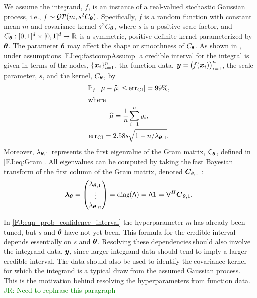 \documentclass[graybox,footinfo]{svmult}
\newcommand{\JRNote}[1]{{\textcolor{green}{JR: #1}}}
\begin{document}
We assume the integrand, $f$, is an instance of a real-valued stochastic Gaussian process, i.e., $f \sim \mathcal{GP}(m,s^2 C_{\boldsymbol{\theta}})$.  Specifically, $f$ is a random function with constant mean $m$ and covariance kernel $s^2C_{\boldsymbol{\theta}}$, where $s$ is a positive scale factor, and $C_{\boldsymbol{\theta}}: [0,1]^d \times [0,1]^d \to \mathbb{R} $ is a symmetric, positive-definite kernel parameterized by ${\boldsymbol{\theta}}$.  The parameter ${\boldsymbol{\theta}}$ may affect the shape or smoothness of $C_{\boldsymbol{\theta}}$. As shown in \cite[Give eq numbers]{RatHic19a}, under assumptions \eqref{FJ:eq:fastcompAssump} a credible interval for the integral is given in terms of the nodes, $\{{\boldsymbol{x}}_i\}_{i=1}^n$, the function data, ${\boldsymbol{y}} = \bigl (f ({\boldsymbol{x}}_i) \bigr)_{i=1}^n$, the scale parameter, $s$, and the kernel, $C_{\boldsymbol{\theta}}$,  by 
\begin{subequations} \label{FJ:eqn_prob_confidence_interval}
	\begin{gather}
	\mathbb{P}_f \left[
	|\mu-\widehat{\mu}| \leq \textup{err}_{\textup{CI}}
	\right] = 99\%, \\
	\intertext{where}
	\label{FJ:muhatGCV-FB-MLE-Simple}
	\widehat{\mu} = \frac 1n \sum_{i=1}^n y_i, \\
	\label{FJ:eqn:errcifast}
	\textup{err}_{\textup{CI}} = 2.58 s \sqrt{1 - n/\lambda_{\bstheta,1} }.
	\end{gather}
\end{subequations}
Moreover, $\lambda_{{\boldsymbol{\theta}},1}$ represents the first eigenvalue of the Gram matrix, $\mathsf{C}_{\boldsymbol{\theta}}$, defined in \eqref{FJ:eq:Gram}.  All eigenvalues can be computed %
by taking the fast Bayesian transform of the first column of the Gram matrix, denoted ${\boldsymbol{C}}_{{\boldsymbol{\theta}},1}$ \cite[Equation number]{RatHic19a}:
\begin{equation} 
	\bslambda_\bstheta
	= \begin{pmatrix}
		\lambda_{\bstheta,1} \\ \vdots \\ \lambda _{\bstheta,n}
	\end{pmatrix} = \textup{diag}(\mathsf{\Lambda}) = \mathsf{\Lambda} \bsone 
	= \mathsf{V}^H \bsC_{\bstheta,1}.
	\label{FJ:eqn:fast_transform_to_eigvalues}
\end{equation}

In \eqref{FJ:eqn_prob_confidence_interval} the hyperparameter $m$ has already been tuned, but $s$ and ${\boldsymbol{\theta}}$ have not yet been.  %
This formula for the credible interval depends essentially on $s$ and ${\boldsymbol{\theta}}$.  Resolving these dependencies should also involve the integrand data,  ${\boldsymbol{y}}$, since larger integrand data should tend to imply a larger credible interval. The data should also be used to identify the covariance kernel for which the integrand is a typical draw from the assumed Gaussian process. This is the motivation behind resolving the hyperparameters from function data. 
\JRNote{Need to rephrase this paragraph}
\end{document}
